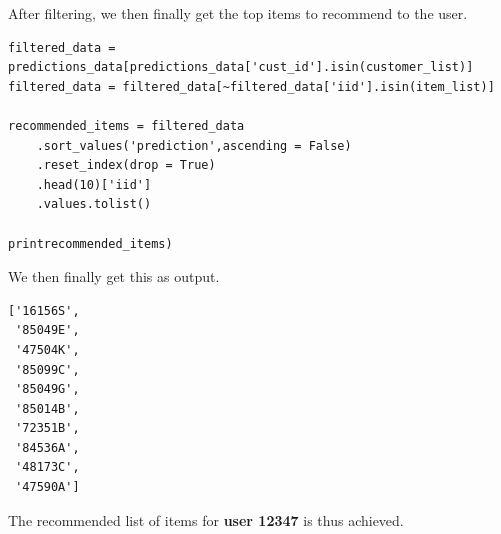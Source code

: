 \documentclass{article}
\begin{document}
After filtering, we then finally get the top items to recommend to the user.

\begin{lstlisting}
filtered_data = predictions_data[predictions_data['cust_id'].isin(customer_list)]
filtered_data = filtered_data[~filtered_data['iid'].isin(item_list)]

recommended_items = filtered_data
    .sort_values('prediction',ascending = False)
    .reset_index(drop = True)
    .head(10)['iid']
    .values.tolist()

printrecommended_items)
\end{lstlisting}

We then finally get this as output.

\begin{lstlisting}
['16156S',
 '85049E',
 '47504K',
 '85099C',
 '85049G',
 '85014B',
 '72351B',
 '84536A',
 '48173C',
 '47590A']
\end{lstlisting}

The recommended list of items for \textbf{user 12347} is thus achieved.
\end{document}
